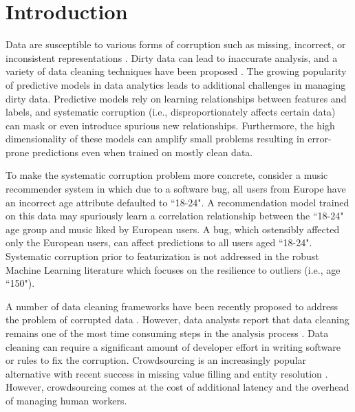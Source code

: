 \section{Introduction}
Data are susceptible to various forms of corruption such as missing, incorrect, or inconsistent representations \cite{Gartner}.
Dirty data can lead to inaccurate analysis, and a variety of data cleaning techniques have been proposed \cite{rahm2000data}.
The growing popularity of predictive models in data analytics \cite{bdas, alexandrov2014stratosphere, crotty2014tupleware, hellerstein2012madlib} leads to additional challenges in managing dirty data.
Predictive models rely on learning relationships between features and labels, and systematic corruption \cite{taylor1982introduction} (i.e., disproportionately affects certain data) can mask or even introduce spurious new relationships.
Furthermore, the high dimensionality of these models can amplify small problems \cite{xiaofeature} resulting in error-prone predictions even when trained on mostly clean data.

To make the systematic corruption problem more concrete, consider a music recommender system in which due to a software bug, all users from Europe have an incorrect age attribute defaulted to ``18-24".
A recommendation model trained on this data may spuriously learn a correlation relationship between the ``18-24" age group and music liked by European users.
A bug, which ostensibly affected only the European users, can affect predictions to all users aged ``18-24".
Systematic corruption prior to featurization is not addressed in the robust Machine Learning literature which focuses on the resilience to outliers (i.e., age ``150").

A number of data cleaning frameworks have been recently proposed to address the problem of corrupted data \cite{khayyat2015bigdansing, chu2015katara, sampleclean}.
However, data analysts report that data cleaning remains one of the most time consuming steps in the analysis process \cite{nytimes}.
Data cleaning can require a significant amount of developer effort in writing software or rules to fix the corruption.
Crowdsourcing is an increasingly popular alternative with recent success in missing value filling and entity resolution \cite{gokhale2014corleone, park2014crowdfill, sampleclean,chu2015katara}.
However, crowdsourcing comes at the cost of additional latency and the overhead of managing human workers.

